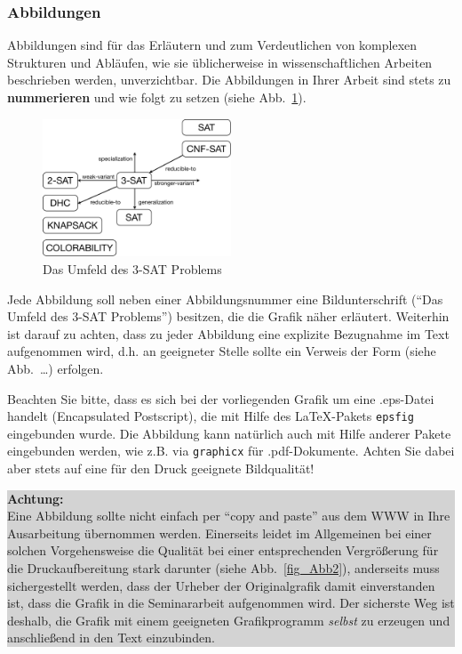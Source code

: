 \subsubsection{Abbildungen}
Abbildungen sind für das Erläutern und zum Verdeutlichen von komplexen Strukturen und Abläufen, wie sie üblicherweise in wissenschaftlichen Arbeiten beschrieben werden, unverzichtbar.
Die Abbildungen in Ihrer Arbeit sind stets zu {\bf nummerieren} und wie folgt zu setzen (siehe Abb.~\ref{fig_Abb1}).
\begin{figure}[ht]
  \begin{center}
  \includegraphics[width=0.5\textwidth]{images/3sat.pdf}
  \end{center}
  \caption{Das Umfeld des 3-SAT Problems}
  \label{fig_Abb1}
\end{figure} 

Jede Abbildung soll neben einer Abbildungsnummer eine Bildunterschrift ("`Das Umfeld des 3-SAT Problems"') besitzen, die die Grafik näher erläutert.
Weiterhin ist darauf zu achten, dass zu jeder Abbildung eine explizite Bezugnahme im Text aufgenommen wird, d.h. an geeigneter Stelle sollte ein Verweis der Form (siehe Abb.~\dots) erfolgen.

Beachten Sie bitte, dass es sich bei der vorliegenden Grafik um eine .eps-Datei handelt (Encapsulated Postscript), die mit Hilfe des \LaTeX-Pakets {\tt epsfig} eingebunden wurde.
Die Abbildung kann natürlich auch mit Hilfe anderer Pakete eingebunden werden, wie z.B. via {\tt graphicx} für .pdf-Dokumente.
Achten Sie dabei aber stets auf eine für den Druck geeignete Bildqualität!

\smallskip

\begin{center}
\colorbox{lightgray}{
\parbox{140mm}{
{\bf Achtung:} \\
Eine Abbildung sollte nicht einfach per "`copy and paste"' aus dem WWW in Ihre Ausarbeitung übernommen werden. 
Einerseits leidet im Allgemeinen bei einer solchen Vorgehensweise die Qualität bei einer entsprechenden Vergrößerung für die Druckaufbereitung stark darunter (siehe Abb.~\ref{fig_Abb2}), anderseits muss sichergestellt werden, dass der Urheber der Originalgrafik damit einverstanden ist, dass die Grafik in die Seminararbeit aufgenommen wird.
Der sicherste Weg ist deshalb, die Grafik mit einem geeigneten Grafikprogramm {\em selbst} zu erzeugen und anschließend in den Text einzubinden.}}
\end{center}

